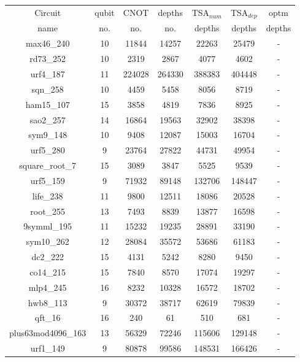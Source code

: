 \documentclass[runningheads]{llncs}
\begin{document}
								\begin{table}[H]
									\begin{center}  
									\begin{tabular}{|c|c|c|c|c|c|c|}
									\hline
									Circuit &  qubit  & CNOT &depths &TSA$_{num}$& TSA$_{dep}$  & optm 	  	\\
									 name	&   no. 	&	no. & no. & depths&  depths &  depths 	\\
									\hline
									max46\_240 & 10 & 11844 & 14257 & 22263 & 25479 & - \\
									rd73\_252 & 10 & 2319 & 2867 & 4077 & 4602 & - \\
									urf4\_187 & 11 & 224028 & 264330 & 388383 & 404448 & - \\
									sqn\_258 & 10 & 4459 & 5458 & 8056 & 8719 & - \\
									ham15\_107 & 15 & 3858 & 4819 & 7836 & 8925 & - \\
									sao2\_257 & 14 & 16864 & 19563 & 32902 & 38398 & - \\
									sym9\_148 & 10 & 9408 & 12087 & 15003 & 16704 & - \\
									urf5\_280 & 9 & 23764 & 27822 & 44731 & 49954 & - \\
									square\_root\_7 & 15 & 3089 & 3847 & 5525 & 9539 & - \\
									urf5\_159 & 9 & 71932 & 89148 & 132706 & 148447 & - \\
									life\_238 & 11 & 9800 & 12511 & 18086 & 20528 & - \\
									root\_255 & 13 & 7493 & 8839 & 13877 & 16598 & - \\
									9symml\_195 & 11 & 15232 & 19235 & 28891 & 33190 & - \\
									sym10\_262 & 12 & 28084 & 35572 & 53686 & 61183 & - \\
									dc2\_222 & 15 & 4131 & 5242 & 8280 & 9450 & - \\
									co14\_215 & 15 & 7840 & 8570 & 17074 & 19297 & - \\
									mlp4\_245 & 16 & 8232 & 10328 & 16572 & 18702 & - \\
									hwb8\_113 & 9 & 30372 & 38717 & 62619 & 79839 & - \\
									qft\_16 & 16 & 240 & 61 & 510 & 681 & - \\
									plus63mod4096\_163 & 13 & 56329 & 72246 & 115606 & 129148 & - \\
									urf1\_149 & 9 & 80878 & 99586 & 148531 & 166426 & - \\

\end{tabular}
\end{center}
\end{table}
\end{document}
